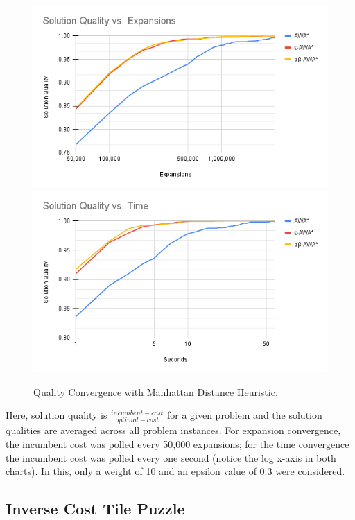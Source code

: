\begin{figure}
    \includegraphics[width=\linewidth]{media/man-Solution Quality vs. Expansions.png}
    \includegraphics[width=\linewidth]{media/man-Solution Quality vs. Time.png}
    \caption{Quality Convergence with Manhattan Distance Heuristic.} \label{fig:conv-man}
\end{figure}

Here, solution quality is $\frac{incumbent-cost}{optimal-cost}$ for a given problem and the solution qualities are averaged across all problem instances. For expansion convergence, the incumbent cost was polled every 50,000 expansions; for the time convergence the incumbent cost was polled every one second (notice the log x-axis in both charts). In this, only a weight of 10 and an epsilon value of 0.3 were considered. 

\subsection{Inverse Cost Tile Puzzle}



